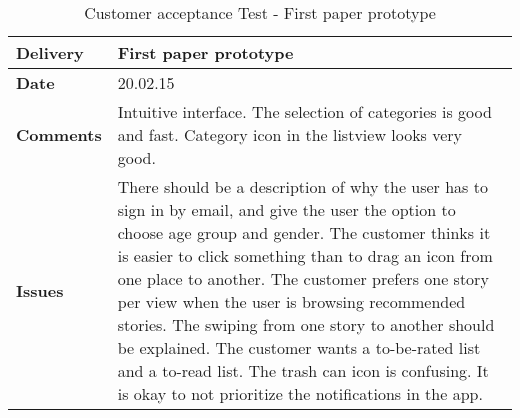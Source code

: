 \renewcommand{\arraystretch}{2}%
\begin{center}
	\begin{longtable}{ | p{4cm} | p{13cm} | }
		
		\caption[Customer acceptance test]{Customer acceptance Test - First paper prototype } \label{Tab:cattest1}\\
		\hline
		\textbf{Delivery} & First paper prototype\\ \hline
		\textbf{Date} & 20.02.15 \\ \hline 
		\textbf{Comments} &Intuitive interface. The selection of categories is good and fast. Category icon in the listview looks very good.
		\\ \hline
		\textbf{Issues} &
		There should be a description of why the user has to sign in by email, and give the user the option to choose age group and gender. The customer thinks it is easier to click something than to drag an icon from one place to another.  The customer prefers one story per view when the user is browsing recommended stories. The swiping from one story to another should be explained. The customer wants a to-be-rated list and a to-read list. The trash can icon is confusing. It is okay to not prioritize the notifications in the app. 	
		\\ \hline
		
	\end{longtable}
\end{center}

